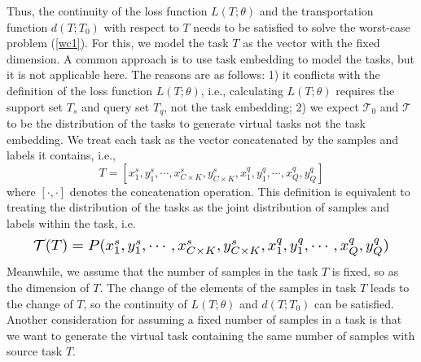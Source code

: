 \documentclass{article}
\begin{document}
Thus, the continuity of the loss function $L(T;\theta)$ and the transportation function $d(T;T_0)$ with respect to $T$ needs to be satisfied to solve the worst-case problem (\ref{wc1}). For this, we model the task $T$ as the vector with the fixed dimension. A common approach is to use task embedding to model the tasks, but it is not applicable here. The reasons are as follows: 1) it conflicts with the definition of the loss function $L(T;\theta)$, i.e., calculating $L(T;\theta)$ requires the support set $T_s$ and query set $T_q$, not the task embedding; 2) we expect $\mathcal{T}_0$ and $\mathcal{T}$ to be the distribution of the tasks to generate virtual tasks not the task embedding. We treat each task as the vector concatenated by the samples and labels it contains, i.e.,
\begin{equation}\label{task}
    T=[x_1^s,y_1^s,\cdots,x_{C\times K}^s,y_{C\times K}^s,x_1^q,y_1^q,\cdots,x_{Q}^q,y_{Q}^q]
\end{equation}
where $[\cdot,\cdot]$ denotes the concatenation operation. This definition is equivalent to treating the distribution of the tasks as the joint distribution of samples and labels within the task, i.e.
\begin{equation}
\resizebox{.91\linewidth}{!}{$\mathcal{T}(T)=P(x_1^s,y_1^s,\cdots,x_{C\times K}^s,y_{C\times K}^s,x_1^q,y_1^q,\cdots,x_{Q}^q,y_{Q}^q)$}
\end{equation}
Meanwhile, we assume that the number of samples in the task $T$ is fixed, so as the dimension of $T$. The change of the elements of the samples in task $T$ leads to the change of $T$, so the continuity of $L(T;\theta)$ and $d(T;T_0)$ can be satisfied. Another consideration for assuming a fixed number of samples in a task is that we want to generate the virtual task containing the same number of samples with source task $T$.
\end{document}
